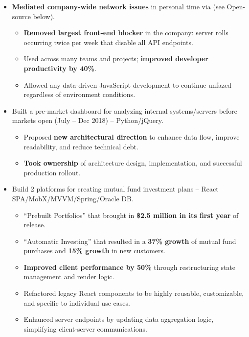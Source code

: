 \documentclass[10pt, letterpaper]{article}
\let\oldunderline\underline
\renewcommand{\underline}[1]{\oldunderline{\smash{#1}}}
\newcommand{\ul}[1]{%
    \begin{itemize}%
    #1%
    \end{itemize}%
}
\newcommand{\q}[1]{``#1''}
\begin{document}
\ul{
    \item \textbf{Mediated company-wide network issues} in personal time via \underline{MockRequests} (see Open-source below).

    \ul{
        \item \textbf{Removed largest front-end blocker} in the company: server rolls occurring twice per week that disable all API endpoints.

        \item Used across many teams and projects; \textbf{improved developer productivity by 40\%}.

        \item Allowed any data-driven JavaScript development to continue unfazed regardless of environment conditions.
    }

    \item Built a pre-market dashboard for analyzing internal systems/servers before markets open (July -- Dec 2018) -- Python/jQuery.

    \ul{
        \item Proposed \textbf{new architectural direction} to enhance data flow, improve readability, and reduce technical debt.

        \item \textbf{Took ownership} of architecture design, implementation, and successful production rollout.
    }

    \item Build 2 platforms for creating mutual fund investment plans -- React SPA/MobX/MVVM/Spring/Oracle DB.

    \ul{
        \item \q{Prebuilt Portfolios} that brought in \textbf{\$2.5 million in its first year} of release.

        \item \q{Automatic Investing} that resulted in a \textbf{37\% growth} of mutual fund purchases and \textbf{15\% growth} in new customers.

        \item \textbf{Improved client performance by 50\%} through restructuring state management and render logic.

        \item Refactored legacy React components to be highly reusable, customizable, and specific to individual use cases.

        \item Enhanced server endpoints by updating data aggregation logic, simplifying client-server communications.
    }

}
\end{document}
